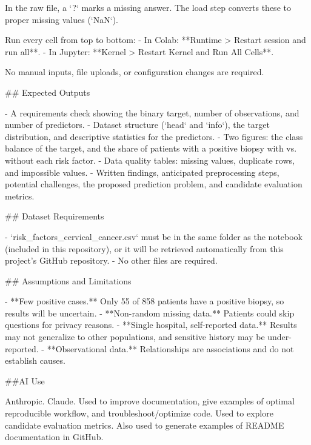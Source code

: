 In the raw file, a `?` marks a missing answer. The load step converts these to proper
missing values (`NaN`).

Run every cell from top to bottom:
- In Colab: **Runtime > Restart session and run all**.
- In Jupyter: **Kernel > Restart Kernel and Run All Cells**.

No manual inputs, file uploads, or configuration changes are required.

## Expected Outputs

- A requirements check showing the binary target, number of observations, and number of
  predictors.
- Dataset structure (`head` and `info`), the target distribution, and descriptive
  statistics for the predictors.
- Two figures: the class balance of the target, and the share of patients with a positive
  biopsy with vs. without each risk factor.
- Data quality tables: missing values, duplicate rows, and impossible values.
- Written findings, anticipated preprocessing steps, potential challenges, the proposed
  prediction problem, and candidate evaluation metrics.

## Dataset Requirements

- `risk_factors_cervical_cancer.csv` must be in the same folder as the notebook (included
  in this repository), or it will be retrieved automatically from this project's GitHub
  repository.
- No other files are required.

## Assumptions and Limitations

- **Few positive cases.** Only 55 of 858 patients have a positive biopsy, so results will
  be uncertain.
- **Non-random missing data.** Patients could skip questions for privacy reasons.
- **Single hospital, self-reported data.** Results may not generalize to other
  populations, and sensitive history may be under-reported.
- **Observational data.** Relationships are associations and do not establish causes.

##AI Use

Anthropic. Claude. Used to improve documentation, give examples of optimal 
reproducible workflow, and troubleshoot/optimize code. Used to explore candidate evaluation metrics. 
Also used to generate examples of README documentation in GitHub.
